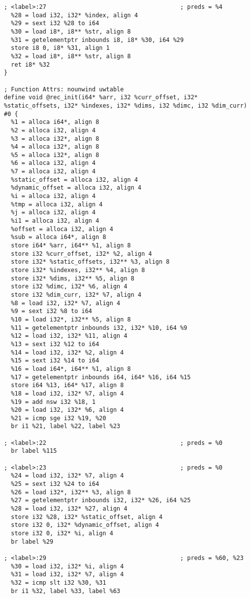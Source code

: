\begin{verbatim}
; <label>:27                                      ; preds = %4
  %28 = load i32, i32* %index, align 4
  %29 = sext i32 %28 to i64
  %30 = load i8*, i8** %str, align 8
  %31 = getelementptr inbounds i8, i8* %30, i64 %29
  store i8 0, i8* %31, align 1
  %32 = load i8*, i8** %str, align 8
  ret i8* %32
}

; Function Attrs: nounwind uwtable
define void @rec_init(i64* %arr, i32 %curr_offset, i32* %static_offsets, i32* %indexes, i32* %dims, i32 %dimc, i32 %dim_curr) #0 {
  %1 = alloca i64*, align 8
  %2 = alloca i32, align 4
  %3 = alloca i32*, align 8
  %4 = alloca i32*, align 8
  %5 = alloca i32*, align 8
  %6 = alloca i32, align 4
  %7 = alloca i32, align 4
  %static_offset = alloca i32, align 4
  %dynamic_offset = alloca i32, align 4
  %i = alloca i32, align 4
  %tmp = alloca i32, align 4
  %j = alloca i32, align 4
  %i1 = alloca i32, align 4
  %offset = alloca i32, align 4
  %sub = alloca i64*, align 8
  store i64* %arr, i64** %1, align 8
  store i32 %curr_offset, i32* %2, align 4
  store i32* %static_offsets, i32** %3, align 8
  store i32* %indexes, i32** %4, align 8
  store i32* %dims, i32** %5, align 8
  store i32 %dimc, i32* %6, align 4
  store i32 %dim_curr, i32* %7, align 4
  %8 = load i32, i32* %7, align 4
  %9 = sext i32 %8 to i64
  %10 = load i32*, i32** %5, align 8
  %11 = getelementptr inbounds i32, i32* %10, i64 %9
  %12 = load i32, i32* %11, align 4
  %13 = sext i32 %12 to i64
  %14 = load i32, i32* %2, align 4
  %15 = sext i32 %14 to i64
  %16 = load i64*, i64** %1, align 8
  %17 = getelementptr inbounds i64, i64* %16, i64 %15
  store i64 %13, i64* %17, align 8
  %18 = load i32, i32* %7, align 4
  %19 = add nsw i32 %18, 1
  %20 = load i32, i32* %6, align 4
  %21 = icmp sge i32 %19, %20
  br i1 %21, label %22, label %23

; <label>:22                                      ; preds = %0
  br label %115

; <label>:23                                      ; preds = %0
  %24 = load i32, i32* %7, align 4
  %25 = sext i32 %24 to i64
  %26 = load i32*, i32** %3, align 8
  %27 = getelementptr inbounds i32, i32* %26, i64 %25
  %28 = load i32, i32* %27, align 4
  store i32 %28, i32* %static_offset, align 4
  store i32 0, i32* %dynamic_offset, align 4
  store i32 0, i32* %i, align 4
  br label %29

; <label>:29                                      ; preds = %60, %23
  %30 = load i32, i32* %i, align 4
  %31 = load i32, i32* %7, align 4
  %32 = icmp slt i32 %30, %31
  br i1 %32, label %33, label %63


\end{verbatim}
